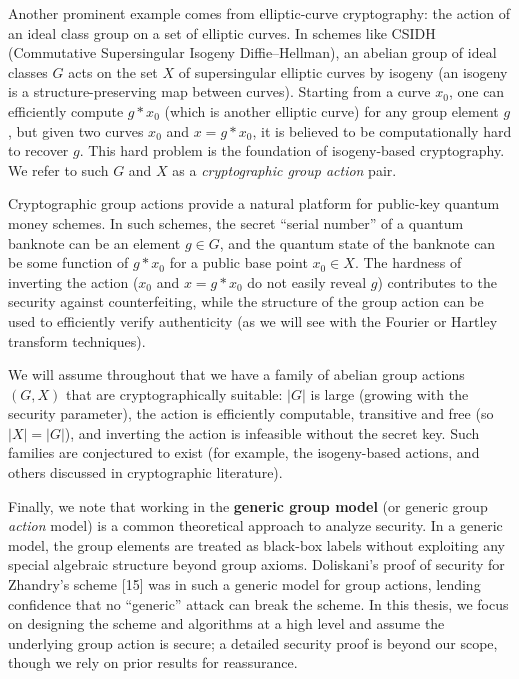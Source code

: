 \documentclass[12pt]{report}
\begin{document}
Another prominent example comes from elliptic-curve cryptography: the action of an ideal class group on a set of elliptic curves. In schemes like CSIDH (Commutative Supersingular Isogeny Diffie–Hellman), an abelian group of ideal classes $G$ acts on the set $X$ of supersingular elliptic curves by isogeny (an isogeny is a structure-preserving map between curves). Starting from a curve $x_0$, one can efficiently compute $g * x_0$ (which is another elliptic curve) for any group element $g$, but given two curves $x_0$ and $x = g * x_0$, it is believed to be computationally hard to recover $g$. This hard problem is the foundation of isogeny-based cryptography. We refer to such $G$ and $X$ as a \emph{cryptographic group action} pair.

Cryptographic group actions provide a natural platform for public-key quantum money schemes. In such schemes, the secret “serial number” of a quantum banknote can be an element $g \in G$, and the quantum state of the banknote can be some function of $g*x_0$ for a public base point $x_0 \in X$. The hardness of inverting the action ($x_0$ and $x = g*x_0$ do not easily reveal $g$) contributes to the security against counterfeiting, while the structure of the group action can be used to efficiently verify authenticity (as we will see with the Fourier or Hartley transform techniques).

We will assume throughout that we have a family of abelian group actions $(G,X)$ that are cryptographically suitable: $|G|$ is large (growing with the security parameter), the action is efficiently computable, transitive and free (so $|X|=|G|$), and inverting the action is infeasible without the secret key. Such families are conjectured to exist (for example, the isogeny-based actions, and others discussed in cryptographic literature). 

Finally, we note that working in the \textbf{generic group model} (or generic group \emph{action} model) is a common theoretical approach to analyze security. In a generic model, the group elements are treated as black-box labels without exploiting any special algebraic structure beyond group axioms. Doliskani’s proof of security for Zhandry’s scheme [15] was in such a generic model for group actions, lending confidence that no “generic” attack can break the scheme. In this thesis, we focus on designing the scheme and algorithms at a high level and assume the underlying group action is secure; a detailed security proof is beyond our scope, though we rely on prior results for reassurance.
\end{document}
